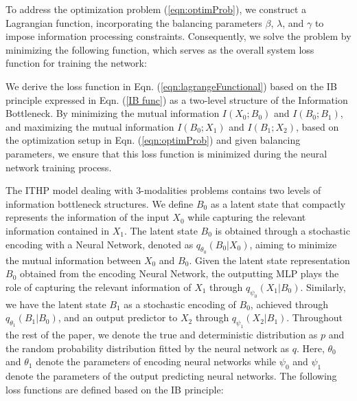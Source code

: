 \documentclass{article} %
\begin{document}
To address the optimization problem (\ref{eqn:optimProb}), we construct a Lagrangian function, incorporating the balancing parameters $\beta$, $\lambda$, and $\gamma$ to impose information processing constraints. Consequently, we solve the problem by minimizing the following function, which serves as the overall system loss function for training the network:



We derive the loss function in Eqn. (\ref{eqn:lagrangeFunctional}) based on the IB principle expressed in Eqn. (\ref{IB func}) as a two-level structure of the Information Bottleneck. By minimizing the mutual information $I(X_{0};B_{0})$ and $I(B_{0};B_{1})$, and maximizing the mutual information $I(B_{0};X_{1})$ and $I(B_{1};X_{2})$, based on the optimization setup in Eqn. (\ref{eqn:optimProb}) and given balancing parameters, we ensure that this loss function is minimized during the neural network training process.

The ITHP model dealing with 3-modalities problems contains two levels of information bottleneck structures. We define ${B}_{0}$ as a latent state that compactly represents the information of the input ${X}_{0}$ while capturing the relevant information contained in ${X}_{1}$. The latent state ${B}_{0}$ is obtained through a stochastic encoding with a Neural Network, denoted as $q_{\theta_{0}} \left ( B_{0}|X_{0} \right ) $, aiming to minimize the mutual information between $X_{0}$ and $B_{0}$. Given the latent state representation $B_{0}$ obtained from the encoding Neural Network, the outputting MLP plays the role of capturing the relevant information of $X_{1}$ through $q_{\psi_{0} } \left ( X_{1}|B_{0} \right ) $. Similarly, we have the latent state ${B}_{1}$ as a stochastic encoding of ${B}_{0}$, achieved through $q_{\theta_{1} } \left ( B_{1}|B_{0} \right ) $, and an output predictor to ${X}_{2}$ through $q_{\psi_{1} } \left ( X_{2}|B_{1} \right ) $. Throughout the rest of the paper, we denote the true and deterministic distribution as $p$ and the random probability distribution fitted by the neural network as $q$. Here, $\theta_{0}$ and $\theta_{1}$ denote the parameters of encoding neural networks while $\psi_{0}$ and $\psi_{1}$ denote the parameters of the output predicting neural networks. The following loss functions are defined based on the IB principle:
\end{document}
